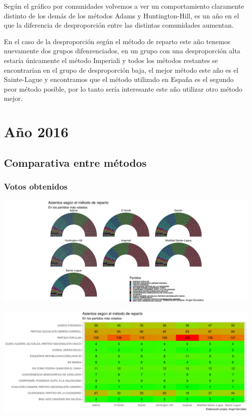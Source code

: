 \documentclass[12pt,a4paper,]{book}
\numberwithin{dummy}{section}
\theoremstyle{ocrenumbox}
\theoremstyle{blacknumex}
\theoremstyle{blacknumbox}
\theoremstyle{ocrenum}
\theoremstyle{ocrenum}
\begin{document}
Según el gráfico por comunidades volvemos a ver un comportamiento
claramente distinto de los demás de los métodos Adams y Huntington-Hill,
es un año en el que la diferencia de desproporción entre las distintas
comunidades aumentan.

En el caso de la desproporción según el método de reparto este año
tenemos nuevamente dos grupos difenrenciados, en un grupo con una
desproporción alta estaría únicamente el método Imperiali y todos los
métodos restantes se encontrarían en el grupo de desproporción baja, el
mejor método este año es el Sainte-Lague y encontramos que el método
utilizado en España es el segundo peor método posible, por lo tanto
sería interesante este año utilizar otro método mejor.

\hypertarget{auxf1o-2016}{%
\section{Año 2016}\label{auxf1o-2016}}

\hypertarget{comparativa-entre-muxe9todos-12}{%
\subsection{Comparativa entre
métodos}\label{comparativa-entre-muxe9todos-12}}

\hypertarget{votos-obtenidos-12}{%
\subsubsection{Votos obtenidos}\label{votos-obtenidos-12}}

\begin{center}\includegraphics[width=0.95\linewidth]{figurasR/unnamed-chunk-170-1} \end{center}

\begin{center}\includegraphics[width=0.95\linewidth]{figurasR/unnamed-chunk-170-2} \end{center}
\end{document}
